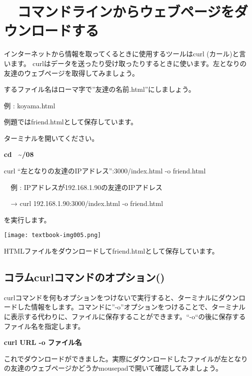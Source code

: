 \clearpage\section{\theExercise　コマンドラインからウェブページをダウンロードする}
\addtocounter{Exercise}{-1}\label{E:CURL}
インターネットから情報を取ってくるときに使用するツールはcurl (カール)と言います。 curlはデータを送ったり受け取ったりするときに使います。左となりの友達のウェブページを取得してみましょう。

するファイル名はローマ字で”友達の名前.html”にしましょう。

例 : koyama.html

例題ではfriend.htmlとして保存しています。

ターミナルを開いてください。

\textbf{cd \ {\textasciitilde}/08}

curl “左となりの友達のIPアドレス”:3000/index.html -o
friend.html

\ \ 例 :
IPアドレスが192.168.1.90の友達のIPアドレス

\ \ → curl 192.168.1.90:3000/index.html -o friend.html

を実行します。

\begin{center}
  \texttt{[image: textbook-img005.png]}
\end{center}

HTMLファイルをダウンロードしてfriend.htmlとして保存しています。

\begin{center}
\begin{boxedminipage}{17.228cm}
\section*{コラムcurlコマンドのオプション()}
curlコマンドを何もオプションをつけないで実行すると、ターミナルにダウンロードした情報をします。コマンドに”-o”オプションをつけることで、ターミナルに表示する代わりに、ファイルに保存することができます。“-o“の後に保存するファイル名を指定します。

	\textbf{curl URL -o ファイル名}
\end{boxedminipage}
\end{center}

\clearpage
これでダウンロードができました。実際にダウンロードしたファイルが左となりの友達のウェブページかどうかmousepadで開いて確認してみましょう。

